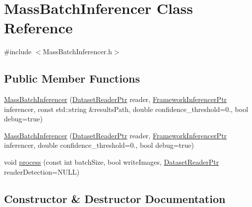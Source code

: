 \hypertarget{class_mass_batch_inferencer}{}\section{Mass\+Batch\+Inferencer Class Reference}
\label{class_mass_batch_inferencer}


{\ttfamily \#include $<$Mass\+Batch\+Inferencer.\+h$>$}

\subsection*{Public Member Functions}
\begin{DoxyCompactItemize}
\item 
\hyperlink{class_mass_batch_inferencer_aee29772d0c4a4ee0f34196cdd0fab6ad}{Mass\+Batch\+Inferencer} (\hyperlink{_dataset_reader_8h_a30d89cba514a220d64d04535c0465f1c}{Dataset\+Reader\+Ptr} reader, \hyperlink{_framework_inferencer_8h_a7b59ebc4b080d1be0d1a6240703011f2}{Framework\+Inferencer\+Ptr} inferencer, const std\+::string \&results\+Path, double confidence\+\_\+threshold=0., bool debug=true)
\item 
\hyperlink{class_mass_batch_inferencer_a62dc237856fd2a295e9308450f9b8218}{Mass\+Batch\+Inferencer} (\hyperlink{_dataset_reader_8h_a30d89cba514a220d64d04535c0465f1c}{Dataset\+Reader\+Ptr} reader, \hyperlink{_framework_inferencer_8h_a7b59ebc4b080d1be0d1a6240703011f2}{Framework\+Inferencer\+Ptr} inferencer, double confidence\+\_\+threshold=0., bool debug=true)
\item 
void \hyperlink{class_mass_batch_inferencer_aeebcf30a5d03aac850f021d8f0ea5767}{process} (const int batch\+Size, bool write\+Images, \hyperlink{_dataset_reader_8h_a30d89cba514a220d64d04535c0465f1c}{Dataset\+Reader\+Ptr} reader\+Detection=N\+U\+LL)
\end{DoxyCompactItemize}


\subsection{Constructor \& Destructor Documentation}
\mbox{\label{class_mass_batch_inferencer_aee29772d0c4a4ee0f34196cdd0fab6ad}} 
